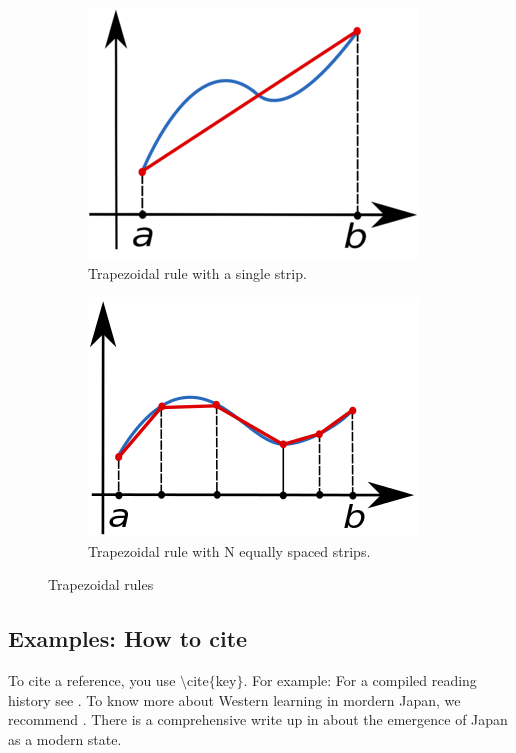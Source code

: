 \documentclass[12pt,a4paper]{article}
\begin{document}
\begin{figure}[h]
	\begin{subfigure}[b]{0.45\textwidth}
		\includegraphics[width=\textwidth]{trapez1.png}
		\caption{Trapezoidal rule with a single strip.}
		\label{fig:1}
	\end{subfigure}
	\begin{subfigure}[b]{0.45\textwidth}
		\includegraphics[width=\textwidth]{trapez2.png} 
		\caption{Trapezoidal rule with N equally spaced strips.}
		\label{fig:2}
	\end{subfigure}
	\caption{Trapezoidal rules}
	\label{fig:3}
\end{figure}

\newpage
\subsection{Examples: How to cite}
To cite a reference, you use  $\setminus$cite$\{$key$\}$. For example: For a compiled reading history see \cite{notes}. To know more about Western learning in mordern Japan, we recommend \cite{fo, notes}. There is a comprehensive write up in \cite{norman} about the emergence of Japan as a modern state.
\end{document}
